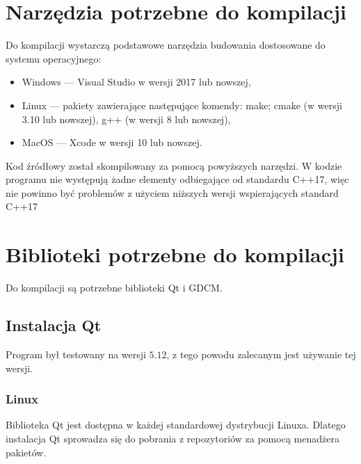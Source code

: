 

\section{Narzędzia potrzebne do kompilacji}

\par
Do kompilacji wystarczą podstawowe narzędzia budowania dostosowane do systemu operacyjnego:

\begin{itemize}
    \item Windows --- Visual Studio w wersji 2017 lub nowszej,
    \item Linux --- pakiety zawierające następujące komendy: make; cmake (w wersji 3.10 lub nowszej), g++ (w wersji 8 lub nowszej),
    \item MacOS --- Xcode w wersji 10 lub nowszej.
\end{itemize}

Kod źródłowy został skompilowany za pomocą powyższych narzędzi.
W kodzie programu nie występują żadne elementy odbiegające od standardu C++17, więc nie powinno być problemów z użyciem niższych wersji wspierających standard C++17

\section{Biblioteki potrzebne do kompilacji}

Do kompilacji są potrzebne biblioteki Qt i GDCM.

\subsection{Instalacja Qt}

Program był testowany na wersji $5.12$, z tego powodu zalecanym jest używanie tej wersji.

\subsubsection*{Linux}

Biblioteka Qt jest dostępna w każdej standardowej dystrybucji Linuxa.
Dlatego instalacja Qt sprowadza się do pobrania z repozytoriów za pomocą menadżera pakietów.

